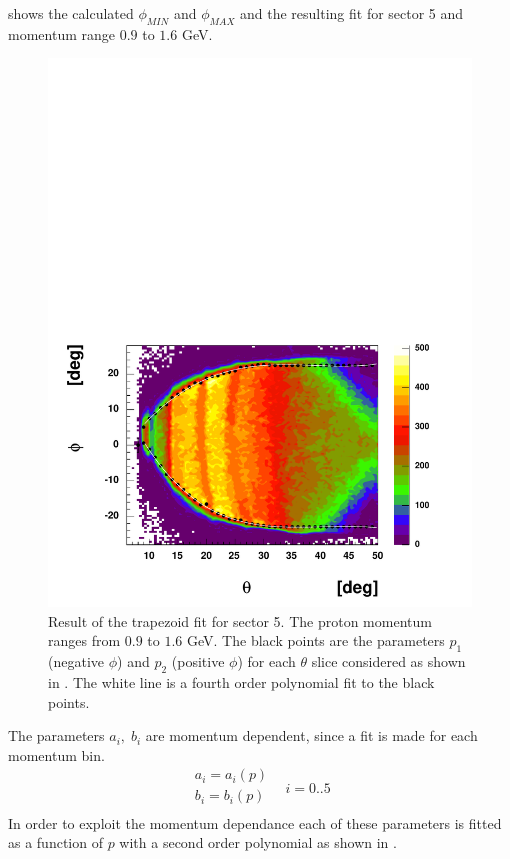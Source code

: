  shows the calculated $\phi_{MIN}$ and $\phi_{MAX}$  and the resulting fit 
for sector 5 and momentum range $0.9$ to $1.6$ GeV.

\begin{figure}[h]
 \begin{center}
 \includegraphics[width = 13cm, bb=0 0 580 430]{data_reduction/img/traped_fit_result_s5}  
  \caption[Result of the trapezoid fit]
          { Result of the trapezoid fit for sector 5. The proton momentum ranges from $0.9$ 
	             to $1.6$ GeV. 
	             The black points are the parameters $p_1$ (negative $\phi$) and $p_2$ (positive $\phi$)
                     for each $\theta$ slice considered as shown in .
		     The white line is a fourth order polynomial fit to the black points.}
 \label{fig:traped_fit_result_s5}
 \end{center}
\end{figure}
\cia
The parameters $a_i , \; b_i $ are momentum dependent, since a fit is made for each momentum bin.
$$
\begin{array}{c}
 a_i = a_i(p) \\
 b_i = b_i(p) \\ 
\end{array}
\,\,\,\,\,i = 0..5
$$
In order to exploit the momentum dependance
each of these parameters is fitted as a function of $p$ 
with a second order polynomial as shown in .


